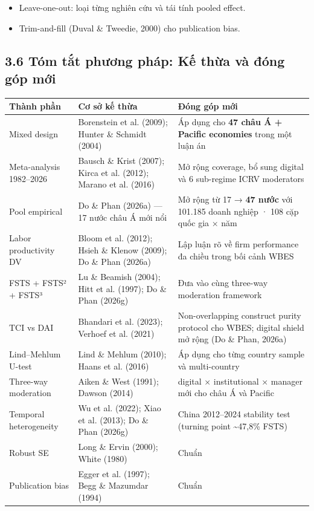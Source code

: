 \documentclass[12pt,a4paper]{article}
\providecommand{\tightlist}{\setlength{\itemsep}{0pt}\setlength{\parskip}{0pt}}
\begin{document}
\begin{itemize}
\tightlist
\item
  Leave-one-out: loại từng nghiên cứu và tái tính pooled effect.
\item
  Trim-and-fill (Duval \& Tweedie, 2000) cho publication bias.
\end{itemize}

\hypertarget{36-tuxf3m-tux1eaft-phux1b0ux1a1ng-phuxe1p-kux1ebf-thux1eeba-vuxe0-ux111uxf3ng-guxf3p-mux1edbi}{%
\subsection{3.6 Tóm tắt phương pháp: Kế thừa và đóng góp
mới}\label{36-tuxf3m-tux1eaft-phux1b0ux1a1ng-phuxe1p-kux1ebf-thux1eeba-vuxe0-ux111uxf3ng-guxf3p-mux1edbi}}

\begin{longtable}[]{@{}lll@{}}
\toprule\noalign{}
Thành phần & Cơ sở kế thừa & Đóng góp mới \\
\midrule\noalign{}
\endhead
\bottomrule\noalign{}
\endlastfoot
Mixed design & Borenstein et al. (2009); Hunter \& Schmidt (2004) & Áp
dụng cho \textbf{47 châu Á + Pacific economies} trong một luận án \\
Meta-analysis 1982--2026 & Bausch \& Krist (2007); Kirca et al. (2012);
Marano et al. (2016) & Mở rộng coverage, bổ sung digital và 6 sub-regime
ICRV moderators \\
Pool empirical & Do \& Phan (2026a) --- 17 nước châu Á mới nổi & Mở rộng
từ 17 → \textbf{47 nước} với 101.185 doanh nghiệp · 108 cặp quốc gia ×
năm \\
Labor productivity DV & Bloom et al. (2012); Hsieh \& Klenow (2009); Do
\& Phan (2026a) & Lập luận rõ về firm performance đa chiều trong bối
cảnh WBES \\
FSTS + FSTS² + FSTS³ & Lu \& Beamish (2004); Hitt et al. (1997); Do \&
Phan (2026g) & Đưa vào cùng three-way moderation framework \\
TCI vs DAI & Bhandari et al. (2023); Verhoef et al. (2021) &
Non-overlapping construct purity protocol cho WBES; digital shield mở
rộng (Do \& Phan, 2026a) \\
Lind--Mehlum U-test & Lind \& Mehlum (2010); Haans et al. (2016) & Áp
dụng cho từng country sample và multi-country \\
Three-way moderation & Aiken \& West (1991); Dawson (2014) & digital ×
institutional × manager mới cho châu Á và Pacific \\
Temporal heterogeneity & Wu et al. (2022); Xiao et al. (2013); Do \&
Phan (2026g) & China 2012--2024 stability test (turning point
\textasciitilde47,8\% FSTS) \\
Robust SE & Long \& Ervin (2000); White (1980) & Chuẩn \\
Publication bias & Egger et al. (1997); Begg \& Mazumdar (1994) &
Chuẩn \\
\end{longtable}
\end{document}
